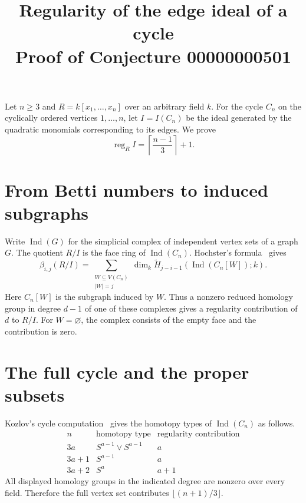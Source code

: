 \documentclass[11pt]{article}
\title{Regularity of the edge ideal of a cycle\\[2pt]
  \large Proof of Conjecture 00000000501}
\author{}
\date{}
\begin{document}
\maketitle

\noindent
Let $n\ge 3$ and $R=k[x_1,\ldots,x_n]$ over an arbitrary field $k$. For
the cycle $C_n$ on the cyclically ordered vertices $1,\ldots,n$, let
$I=I(C_n)$ be the ideal generated by the quadratic monomials corresponding
to its edges. We prove
\[
  \operatorname{reg}_R I=\left\lceil\frac{n-1}{3}\right\rceil+1.
\]

\section*{From Betti numbers to induced subgraphs}

Write $\operatorname{Ind}(G)$ for the simplicial complex of independent
vertex sets of a graph $G$. The quotient $R/I$ is the face ring of
$\operatorname{Ind}(C_n)$. Hochster's formula~\cite[\S5]{hochster} gives
\[
 \beta_{i,j}(R/I)=
   \sum_{\substack{W\subseteq V(C_n)\\ |W|=j}}
   \dim_k \widetilde H_{j-i-1}(\operatorname{Ind}(C_n[W]);k).
\]
Here $C_n[W]$ is the subgraph induced by $W$. Thus a nonzero reduced
homology group in degree $d-1$ of one of these complexes gives a
regularity contribution of $d$ to $R/I$. For $W=\varnothing$, the
complex consists of the empty face and the contribution is zero.

\section*{The full cycle and the proper subsets}

Kozlov's cycle computation~\cite[Proposition~5.2]{kozlov} gives the
homotopy types of $\operatorname{Ind}(C_n)$ as follows.
\[
\begin{array}{c|c|c}
n & \text{homotopy type} & \text{regularity contribution} \\ \hline
3a   & S^{a-1}\vee S^{a-1} & a \\
3a+1 & S^{a-1} & a \\
3a+2 & S^a & a+1
\end{array}
\]
All displayed homology groups in the indicated degree are nonzero over
every field. Therefore the full vertex set contributes
$\lfloor(n+1)/3\rfloor$.
\end{document}
